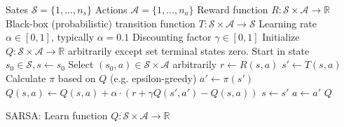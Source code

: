 \documentclass{article}
\begin{document}
\begin{preview}
	\begin{algorithm}[H]
		\begin{algorithmic}
			\Require
			\Statex Sates $\mathcal{S} = \{1, \dots, n_s\}$
			\Statex Actions $\mathcal{A} = \{1, \dots, n_a\}$
			\Statex Reward function $R: \mathcal{S} \times \mathcal{A} \rightarrow \mathbb{R}$
			\Statex Black-box (probabilistic) transition function $T: \mathcal{S} \times \mathcal{A} \rightarrow \mathcal{S}$
			\Statex Learning rate $\alpha \in [0, 1]$, typically $\alpha = 0.1$
			\Statex Discounting factor $\gamma \in [0, 1]$
			\State Initialize $Q: \mathcal{S} \times \mathcal{A} \rightarrow \mathbb{R}$ arbitrarily except set terminal states zero.
			\State Start in state $s_0 \in \mathcal{S}, s \gets s_0$
			\State Select $(s_0, a) \in \mathcal{S} \times \mathcal{A}$ arbitrarily
			\State $r \gets R(s, a)$ 
			\State $s' \gets T(s, a)$ 
			\State Calculate $\pi$ based on $Q$ (e.g. epsilon-greedy)
			\State $a' \gets \pi(s')$
            \State $Q(s, a) \gets  Q(s, a) + \alpha \cdot (r + \gamma Q(s', a')- Q(s, a))$
			\State $s \gets s'$
			\State $a \gets a'$
			\EndWhile
			\EndWhile
			\Return $Q$
			\EndProcedure
		\end{algorithmic}
		\caption{SARSA: Learn function $Q: \mathcal{S} \times \mathcal{A} \rightarrow \mathbb{R}$}
		\label{alg:sarsa}
	\end{algorithm}
\end{preview}
\end{document}
